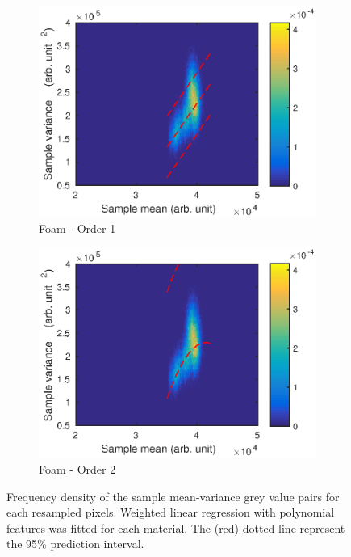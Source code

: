 \documentclass[12pt]{report}
\begin{document}
\begin{figure}
\begin{subfigure}{0.45\textwidth}
		\includegraphics[width=\textwidth]{figures/meanVar/subsample_foam1.eps}
		\caption{Foam - Order 1}
	\end{subfigure}
	\begin{subfigure}{0.45\textwidth}
		\includegraphics[width=\textwidth]{figures/meanVar/subsample_foam2.eps}
		\caption{Foam - Order 2}
	\end{subfigure}
	\caption{Frequency density of the sample mean-variance grey value pairs for each resampled pixels. Weighted linear regression with polynomial features was fitted for each material. The (red) dotted line represent the 95\% prediction interval.}
	\label{fig:subsample_meanVar}
\end{figure}
\end{document}
